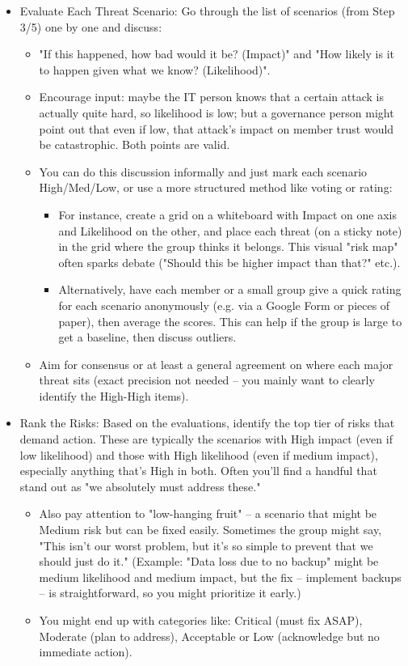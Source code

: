 \begin{itemize}
    \item Evaluate Each Threat Scenario: Go through the list of scenarios (from Step 3/5) one by one and discuss:
    \begin{itemize}   
        \item "If this happened, how bad would it be? (Impact)" and "How likely is it to happen given what
        we know? (Likelihood)".
        \item Encourage input: maybe the IT person knows that a certain attack is actually quite hard, so
        likelihood is low; but a governance person might point out that even if low, that attack's impact on member
        trust would be catastrophic. Both points are valid.
        \item You can do this discussion informally and just mark each scenario High/Med/Low, or use a
        more structured method like voting or rating:
        \begin{itemize}   
            \item For instance, create a grid on a whiteboard with Impact on one axis and Likelihood
            on the other, and place each threat (on a sticky note) in the grid where the group thinks it belongs. This
            visual "risk map" often sparks debate ("Should this be higher impact than that?" etc.).
            \item Alternatively, have each member or a small group give a quick rating for each
            scenario anonymously (e.g. via a Google Form or pieces of paper), then average the scores. This can help if
            the group is large to get a baseline, then discuss outliers.
        \end{itemize}
        \item Aim for consensus or at least a general agreement on where each major threat sits (exact
        precision not needed – you mainly want to clearly identify the High-High items).
    \end{itemize}
    
    \item Rank the Risks: Based on the evaluations, identify the top tier of risks that demand action. These
    are typically the scenarios with High impact (even if low likelihood) and those with High likelihood (even if
    medium impact), especially anything that's High in both. Often you'll find a handful that stand out as "we
    absolutely must address these."
    \begin{itemize}   
        \item Also pay attention to "low-hanging fruit" – a scenario that might be Medium risk but can be
        fixed easily. Sometimes the group might say, "This isn't our worst problem, but it's so simple to prevent that
        we should just do it." (Example: "Data loss due to no backup" might be medium likelihood and medium impact,
        but the fix – implement backups – is straightforward, so you might prioritize it early.)
        \item You might end up with categories like: Critical (must fix ASAP), Moderate (plan to address),
        Acceptable or Low (acknowledge but no immediate action).
    \end{itemize}


\end{itemize}
